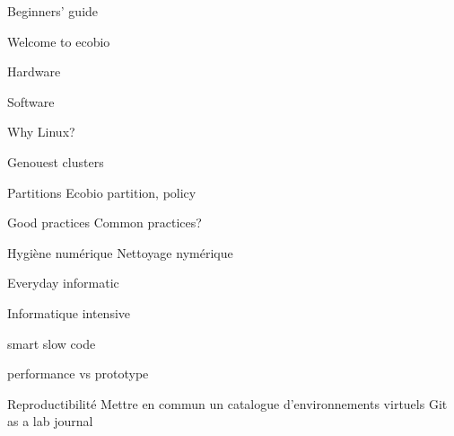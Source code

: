 Beginners' guide



Welcome to ecobio


Hardware


Software

Why Linux?



Genouest clusters

Partitions
Ecobio partition, policy


Good practices
Common practices?

Hygiène numérique
Nettoyage nymérique


Everyday informatic

Informatique intensive

smart
slow code

performance vs prototype



Reproductibilité
Mettre en commun un catalogue d'environnements virtuels
Git as a lab journal
